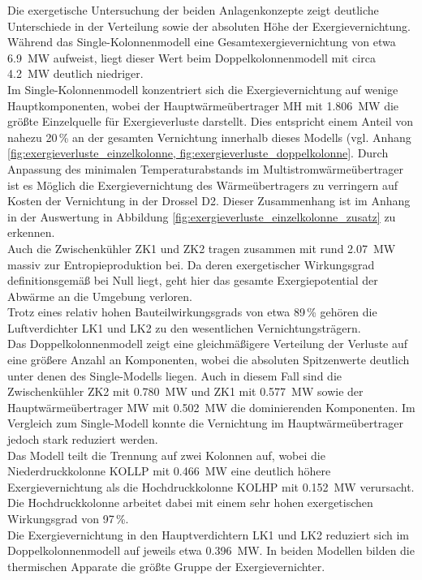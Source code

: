 Die exergetische Untersuchung der beiden Anlagenkonzepte zeigt deutliche Unterschiede in der Verteilung sowie der absoluten Höhe der Exergievernichtung. Während das Single-Kolonnenmodell eine Gesamtexergievernichtung von etwa \SI{6.9}{\mega\watt} aufweist, liegt dieser Wert beim Doppelkolonnenmodell mit circa \SI{4.2}{\mega\watt} deutlich niedriger.\\
Im Single-Kolonnenmodell konzentriert sich die Exergievernichtung auf wenige Hauptkomponenten, wobei der Hauptwärmeübertrager MH mit \SI{1.806}{\mega\watt} die größte Einzelquelle für Exergieverluste darstellt. Dies entspricht einem Anteil von nahezu 20\,\% an der gesamten Vernichtung innerhalb dieses Modells (vgl. Anhang \ref{fig:exergieverluste_einzelkolonne, fig:exergieverluste_doppelkolonne}. Durch Anpassung des minimalen Temperaturabstands im Multistromwärmeübertrager ist es Möglich die Exergievernichtung des Wärmeübertragers zu verringern auf Kosten der Vernichtung in der Drossel D2. Dieser Zusammenhang ist im Anhang in der Auswertung in Abbildung \ref{fig:exergieverluste_einzelkolonne_zusatz} zu erkennen.\\
Auch die Zwischenkühler ZK1 und ZK2 tragen zusammen mit rund \SI{2.07}{\mega\watt} massiv zur Entropieproduktion bei. Da deren exergetischer Wirkungsgrad definitionsgemäß bei Null liegt, geht hier das gesamte Exergiepotential der Abwärme an die Umgebung verloren.\\
Trotz eines relativ hohen Bauteilwirkungsgrads von etwa 89\,\% gehören die Luftverdichter LK1 und LK2 zu den wesentlichen Vernichtungsträgern. \\
Das Doppelkolonnenmodell zeigt eine gleichmäßigere Verteilung der Verluste auf eine größere Anzahl an Komponenten, wobei die absoluten Spitzenwerte deutlich unter denen des Single-Modells liegen. Auch in diesem Fall sind die Zwischenkühler ZK2 mit \SI{0.780}{\mega\watt} und ZK1 mit \SI{0.577}{\mega\watt} sowie der Hauptwärmeübertrager MW mit \SI{0.502}{\mega\watt} die dominierenden Komponenten. Im Vergleich zum Single-Modell konnte die Vernichtung im Hauptwärmeübertrager jedoch stark reduziert werden.\\
Das Modell teilt die Trennung auf zwei Kolonnen auf, wobei die Niederdruckkolonne KOLLP mit \SI{0.466}{\mega\watt} eine deutlich höhere Exergievernichtung als die Hochdruckkolonne KOLHP mit \SI{0.152}{\mega\watt} verursacht. Die Hochdruckkolonne arbeitet dabei mit einem sehr hohen exergetischen Wirkungsgrad von 97\,\%.\\
Die Exergievernichtung in den Hauptverdichtern LK1 und LK2 reduziert sich im Doppelkolonnenmodell auf jeweils etwa \SI{0.396}{\mega\watt}. In beiden Modellen bilden die thermischen Apparate die größte Gruppe der Exergievernichter.\\

